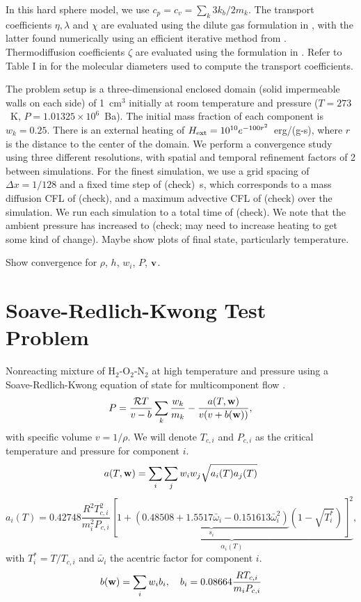 \documentclass[final]{siamltex}
\def\vb {{\bf v}}
\def\wb {{\bf w}}
\def\Hext {H_{\rm ext}}
\begin{document}
In this hard sphere model, we use $c_p = c_v = \sum_k 3k_b/2m_k$.
The transport coefficients $\eta,\lambda$ and $\chi$ are evaluated using the 
dilute gas formulation in \cite{Hirschfelder54}, with the latter found numerically
using an efficient iterative method from \cite{Giovangigli99}.
Thermodiffusion coefficients $\zeta$ are evaluated using the formulation in \cite{Valk}.
Refer to Table I in \cite{LLNS} for the molecular diameters used to compute
the transport coefficients.

The problem setup is a three-dimensional enclosed domain (solid impermeable 
walls on each side) of 1~cm$^3$ initially at room temperature and pressure
($T=273$~K, $P=1.01325\times 10^6$~Ba).  The initial mass fraction of each component
is $w_k = 0.25$.  There is an external heating of $\Hext=10^{10}e^{-100r^2}$~erg/(g-s),
where $r$ is the distance to the center of the domain.  We perform a convergence
study using three different resolutions, with spatial and temporal refinement
factors of 2 between simulations.  For the finest simulation, we use a grid
spacing of $\Delta x = 1/128$ and a fixed time step
of (check)~s, which corresponds to a mass diffusion CFL of (check), and
a maximum advective CFL of (check) over the simulation.
We run each simulation to a total time of (check).
We note that the ambient pressure has increased to (check; may need to increase heating
to get some kind of change).  Maybe show plots of final state, particularly temperature.

Show convergence for $\rho$, $h$, $w_i$, $P$, $\vb$.

\section{Soave-Redlich-Kwong Test Problem}

Nonreacting mixture of H$_2$-O$_2$-N$_2$ at high temperature and pressure
using a Soave-Redlich-Kwong equation of state \cite{RedlichKwong,Soave}
for multicomponent flow \cite{GMD11}.
\begin{equation}
P = \frac{\mathcal{R}T}{v-b}\sum_k\frac{w_k}{m_k} - \frac{a(T,\wb)}{v(v+b(\wb))},
\end{equation}
with specific volume $v=1/\rho$.  We will denote $T_{c,i}$ and $P_{c,i}$ as the critical
temperature and pressure for component $i$.
\begin{equation}
a(T,\wb) = \sum_i\sum_j w_iw_j\sqrt{a_i(T)a_j(T)}
\end{equation}
\begin{equation}
a_i(T) = 0.42748\frac{R^2T_{c,i}^2}{m_i^2 P_{c,i}}\underbrace{\left[1 + \underbrace{\left(0.48508 + 1.5517\bar\omega_i - 0.151613\bar\omega_i^2\right)}_{s_i}\left(1-\sqrt{T_i^*}\right)\right]^2}_{\alpha_i(T)},
\end{equation}
with $T_i^* = T/T_{c,i}$ and $\bar\omega_i$ the acentric factor for component $i$.
\begin{equation}
b(\wb) = \sum_i w_i b_i, \quad b_i = 0.08664\frac{RT_{c,i}}{m_i P_{c,i}}
\end{equation}
\end{document}
